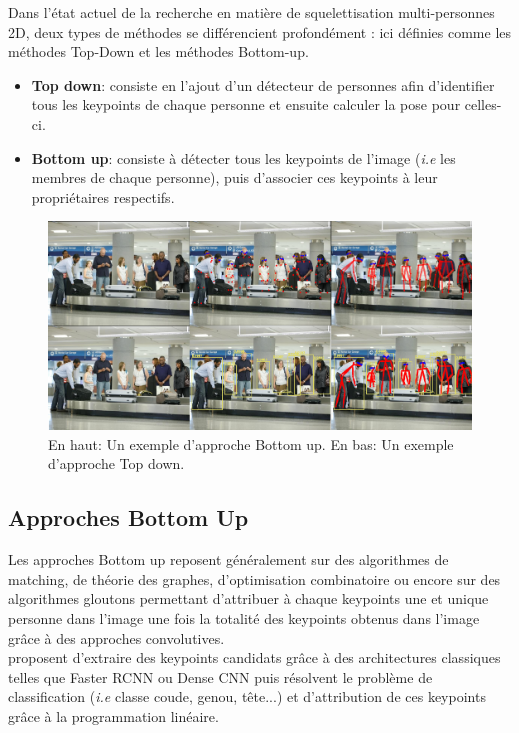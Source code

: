 Dans l'état actuel de la recherche en matière de squelettisation multi-personnes 2D, deux types de méthodes se différencient profondément : ici définies comme les méthodes Top-Down et les méthodes
Bottom-up.
\begin{itemize}
    \item \textbf{Top down}: consiste en l'ajout d'un détecteur de personnes afin d'identifier tous les keypoints de chaque personne et ensuite calculer la pose pour celles-ci.
    \item \textbf{Bottom up}: consiste à détecter tous les keypoints de l'image (\textit{i.e} les membres de chaque personne), puis d'associer ces keypoints à leur propriétaires respectifs.
\end{itemize}

\begin{figure}[H]
    \centering
    \includegraphics[width=1\linewidth]{Images/topvsbottom2.png}
    \caption{En haut: Un exemple d'approche Bottom up. En bas: Un exemple d'approche Top down.}
    \label{fig:topvsbottom}
\end{figure}

\label{subsec:SQUEL}
\subsection{Approches Bottom Up}
Les approches Bottom up reposent généralement sur des algorithmes de matching, de théorie des graphes, d'optimisation combinatoire ou encore sur des algorithmes gloutons permettant d'attribuer à chaque keypoints une et unique personne dans l'image une fois la totalité des keypoints obtenus dans l'image grâce à des approches convolutives.\\

\cite{2015arXiv151106645P} proposent d'extraire des keypoints candidats grâce à des architectures classiques telles que Faster RCNN ou Dense CNN puis résolvent le problème de classification (\textit{i.e} classe coude, genou, tête...) et d'attribution de ces keypoints grâce à la programmation linéaire. 

